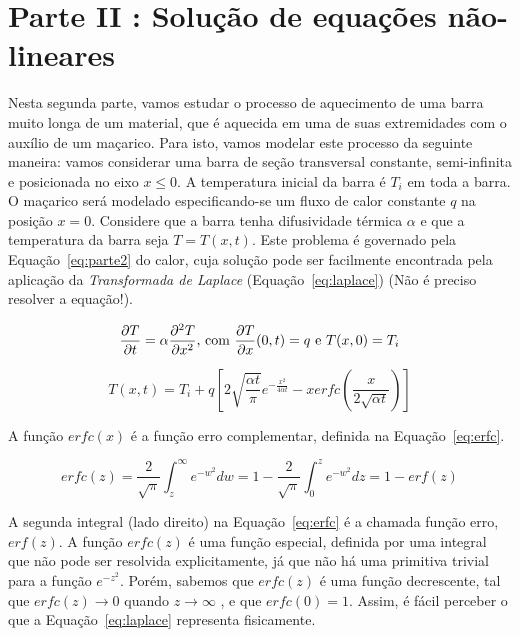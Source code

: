 \documentclass[12pt]{article}
\begin{document}
\section*{Parte II : Solução de equações não-lineares}
\label{sec:parte2}

Nesta segunda parte, vamos estudar o processo de aquecimento de uma barra muito longa de um material, que é aquecida em uma de suas extremidades com o auxílio de um maçarico. Para isto, vamos modelar este processo da seguinte maneira: vamos considerar uma barra de seção transversal constante, semi-infinita e posicionada no eixo $x \leq 0$. A temperatura inicial da barra é $T_{i}$ em toda a barra. O maçarico será modelado especificando-se um fluxo de calor constante $q$ na posição $x = 0$. Considere que a barra tenha difusividade térmica $\alpha$ e que a temperatura da barra seja $T = T (x, t)$. Este problema é governado pela Equação~\ref{eq:parte2} do calor, cuja solução pode ser facilmente encontrada pela aplicação da \textit{Transformada de Laplace} (Equação~\ref{eq:laplace}) (Não é preciso resolver a equação!).

\begin{equation}
\frac{\partial T}{\partial t} = \alpha \frac{\partial^{2} T}{\partial x^{2}} \hbox{, com } \frac{\partial T}{\partial x} (0,t) = q \hbox{ e } T(x,0) = T_{i}
\label{eq:parte2}
\end{equation}

\begin{equation}
T(x, t) = T_{i} + q \left[ 2 \sqrt{\frac{\alpha t}{\pi}} e^{- \frac{x^{2}}{4\alpha t}} - xerfc \left( \frac{x}{2 \sqrt{\alpha t}} \right) \right]
\label{eq:laplace}
\end{equation}

A função $erfc(x)$ é a função erro complementar, definida na Equação~\ref{eq:erfc}.

\begin{equation}
erfc(z) = \frac{2}{\sqrt{\pi}} \int_{z}^{\infty} e^{-w^{2}} dw = 1 - \frac{2}{\sqrt{\pi}} \int_{0}^{z} e^{-w^{2}} dz = 1 - erf(z)
\label{eq:erfc}
\end{equation}

A segunda integral (lado direito) na Equação~\ref{eq:erfc} é a chamada função erro, $erf(z)$. A função $erfc(z)$ é uma função especial, definida por uma integral que não pode ser resolvida explicitamente, já que não há uma primitiva trivial para a função $e^{-z^{2}}$. Porém, sabemos que $erfc(z)$ é uma função decrescente, tal que $erfc(z) \rightarrow 0$ quando $z \rightarrow \infty$ , e que $erfc(0) = 1$. Assim, é fácil perceber o que a Equação~\ref{eq:laplace} representa fisicamente.
\end{document}
